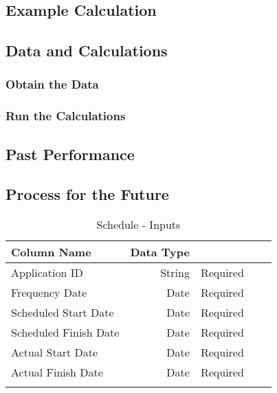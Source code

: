 \documentclass[SDSUThesis.tex]{subfiles}
\begin{document}
    
        
    \subsection{Example Calculation}
    \subsection{Data and Calculations}
    \subsubsection{Obtain the Data}
    \subsubsection{Run the Calculations}
    \subsection{Past Performance}
    \subsection{Process for the Future}


\begin{longtable}{@{}l rr rr}

\toprule%
 \centering%
 {\bfseries Column Name}
 & {\bfseries Data Type}
 &  \\

\cmidrule[0.4pt](r{0.125em}){1-1}%
\cmidrule[0.4pt](lr{0.125em}){2-2}%
\cmidrule[0.4pt](l{0.125em}){3-3}%
\endhead

Application ID & String  & Required \\
\myrowcolour%
Frequency Date & Date & Required \\
Scheduled Start Date & Date & Required \\
\myrowcolour%
Scheduled Finish Date & Date & Required \\
Actual Start Date & Date  & Required \\
\myrowcolour%
Actual Finish Date & Date  & Required \\

\bottomrule

\caption{Schedule - Inputs}
\label{tab:sched}
\end{longtable}
\end{document}
